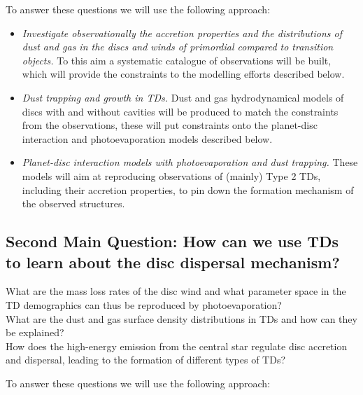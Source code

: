 \documentclass[10pt,fleqn,twoside]{article}
\begin{document}
To answer these questions we will use the following approach: 

\begin{itemize}
\item{\it Investigate observationally the accretion properties
  and the distributions of dust and gas in the discs and winds of
  primordial compared to transition objects.} To this aim a systematic catalogue of observations will be built, which will provide the constraints to the modelling efforts described below. 
\item{\it Dust trapping and growth in TDs.} Dust and
gas hydrodynamical models of discs with and without cavities will be produced to match the
constraints from the observations, these will put constraints onto the
planet-disc interaction and photoevaporation models described below. 
\item{\it Planet-disc interaction models with photoevaporation
  and dust trapping.} These models will aim at reproducing
observations of (mainly) Type 2 TDs, including their accretion properties, to pin down the formation mechanism of the observed structures. 
\end{itemize}



\subsection{Second Main Question: How can we use TDs to learn about the disc dispersal
    mechanism?}
 What are the mass loss rates of the disc wind and
  what parameter space in the TD demographics can thus be reproduced
  by photoevaporation?\\ What are the dust and gas surface density
  distributions in TDs and how can they be
  explained?\\How does the high-energy emission from the central
  star regulate disc accretion and dispersal, leading to the formation
  of different types of TDs?

To answer these questions we will use the following approach: 
\end{document}
